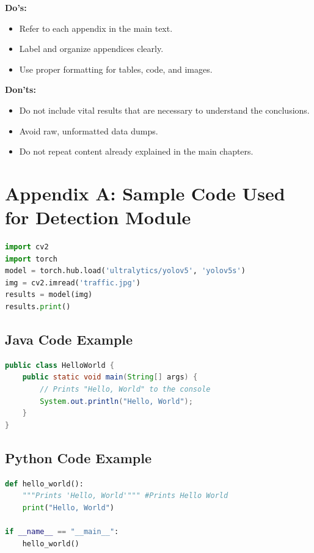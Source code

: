 \documentclass[12pt,a4paper]{report}
\theoremstyle{definition}
\theoremstyle{remark}
\begin{document}
\noindent \textbf{Do's:}
\begin{itemize}
    \item Refer to each appendix in the main text.
    \item Label and organize appendices clearly.
    \item Use proper formatting for tables, code, and images.
\end{itemize}

\noindent \textbf{Don'ts:}
\begin{itemize}
    \item Do not include vital results that are necessary to understand the conclusions.
    \item Avoid raw, unformatted data dumps.
    \item Do not repeat content already explained in the main chapters.
\end{itemize}

\chapter{Appendix A: Sample Code Used for Detection Module}
\label{appendix:code}

\begin{lstlisting}[language=Python, caption=Python Example]
import cv2
import torch
model = torch.hub.load('ultralytics/yolov5', 'yolov5s')
img = cv2.imread('traffic.jpg')
results = model(img)
results.print()
\end{lstlisting}

\section{Java Code Example}
\begin{lstlisting}[language=Java, caption=Java Example]
public class HelloWorld {
    public static void main(String[] args) {
        // Prints "Hello, World" to the console
        System.out.println("Hello, World");
    }
}
\end{lstlisting}

\section{Python Code Example}
\begin{lstlisting}[language=Python, caption=Python Example]
def hello_world():
    """Prints 'Hello, World'""" #Prints Hello World
    print("Hello, World")

if __name__ == "__main__":
    hello_world()
\end{lstlisting}
\end{document}
